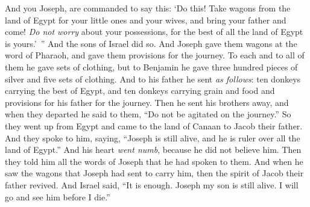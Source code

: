 \begin{biblechapter}
\verse And you Joseph, are commanded to say this: ‘Do this! Take wagons from the land of Egypt for your little ones and your wives, and bring your father and come!
\verse \textit{Do not worry} about your possessions, for the best of all the land of Egypt is yours.’ ”
\verse And the sons of Israel did so. And Joseph gave them wagons at the word of Pharaoh, and gave them provisions for the journey.
\verse To each and to all of them he gave sets of clothing, but to Benjamin he gave three hundred pieces of silver and five sets of clothing.
\verse And to his father he sent \textit{as follows}: ten donkeys carrying the best of Egypt, and ten donkeys carrying grain and food and provisions for his father for the journey.
\verse Then he sent his brothers away, and when they departed he said to them, “Do not be agitated on the journey.”
\verse So they went up from Egypt and came to the land of Canaan to Jacob their father.
\verse And they spoke to him, saying, “Joseph is still alive, and he is ruler over all the land of Egypt.” And his heart \textit{went numb}, because he did not believe him.
\verse Then they told him all the words of Joseph that he had spoken to them. And when he saw the wagons that Joseph had sent to carry him, then the spirit of Jacob their father revived.
\verse And Israel said, “It is enough. Joseph my son is still alive. I will go and see him before I die.”
\end{biblechapter}

